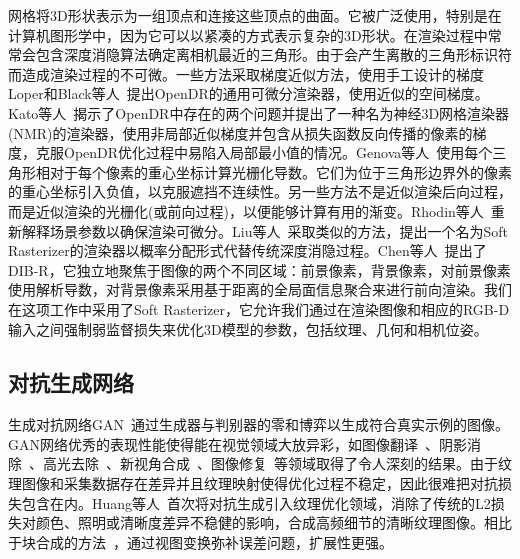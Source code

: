 网格将3D形状表示为一组顶点和连接这些顶点的曲面。它被广泛使用，特别是在计算机图形学中，因为它可以以紧凑的方式表示复杂的3D形状。在渲染过程中常常会包含深度消隐算法确定离相机最近的三角形。由于会产生离散的三角形标识符而造成渲染过程的不可微。一些方法采取梯度近似方法，使用手工设计的梯度Loper和Black等人~\cite{MatthewLoper2014OpenDRAA}提出OpenDR的通用可微分渲染器，使用近似的空间梯度。Kato等人~\cite{MatthiasNiener2013Realtime3R}揭示了OpenDR中存在的两个问题并提出了一种名为神经3D网格渲染器(NMR)的渲染器，使用非局部近似梯度并包含从损失函数反向传播的像素的梯度，克服OpenDR优化过程中易陷入局部最小值的情况。Genova等人~\cite{KyleGenova2018UnsupervisedTF}使用每个三角形相对于每个像素的重心坐标计算光栅化导数。它们为位于三角形边界外的像素的重心坐标引入负值，以克服遮挡不连续性。另一些方法不是近似渲染后向过程，而是近似渲染的光栅化(或前向过程)，以便能够计算有用的渐变。Rhodin等人~\cite{HelgeRhodin2015AVS}重新解释场景参数以确保渲染可微分。Liu等人~\cite{ShichenLiu2019SoftRA}采取类似的方法，提出一个名为Soft Rasterizer的渲染器以概率分配形式代替传统深度消隐过程。Chen等人~\cite{chen2019_dibr}提出了DIB-R，它独立地聚焦于图像的两个不同区域：前景像素，背景像素，对前景像素使用解析导数，对背景像素采用基于距离的全局面信息聚合来进行前向渲染。我们在这项工作中采用了Soft Rasterizer，它允许我们通过在渲染图像和相应的RGB-D输入之间强制弱监督损失来优化3D模型的参数，包括纹理、几何和相机位姿。
\subsection{对抗生成网络}
生成对抗网络GAN~\cite{NIPS2014_5ca3e9b1}通过生成器与判别器的零和博弈以生成符合真实示例的图像。GAN网络优秀的表现性能使得能在视觉领域大放异彩，如图像翻译~\cite{isola2017image}、阴影消除~\cite{fu2021auto}、高光去除~\cite{fu2021multi}、新视角合成~\cite{sauer2023stylegan}、图像修复~\cite{yu2018generative}等领域取得了令人深刻的结果。由于纹理图像和采集数据存在差异并且纹理映射使得优化过程不稳定，因此很难把对抗损失包含在内。Huang等人~\cite{JingweiHuang2020AdversarialTO}首次将对抗生成引入纹理优化领域，消除了传统的L2损失对颜色、照明或清晰度差异不稳健的影响，合成高频细节的清晰纹理图像。相比于块合成的方法~\cite{bi2017patch}，通过视图变换弥补误差问题，扩展性更强。

